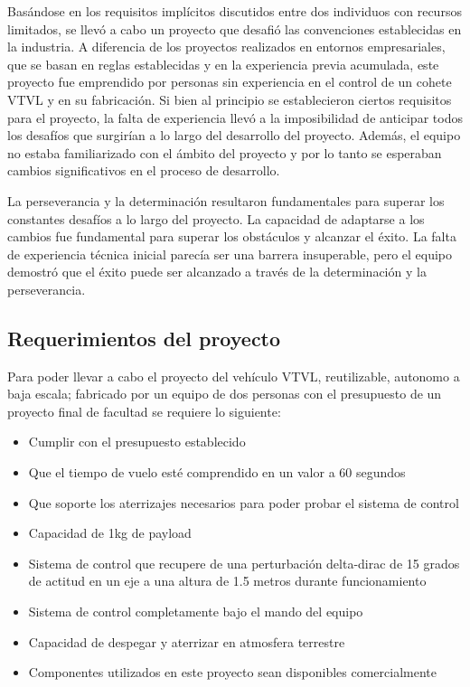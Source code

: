 Basándose en los requisitos implícitos discutidos entre dos individuos con recursos limitados, se llevó a cabo un proyecto que desafió las convenciones establecidas en la industria. A diferencia de los proyectos realizados en entornos empresariales, que se basan en reglas establecidas y en la experiencia previa acumulada, este proyecto fue emprendido por personas sin experiencia en el control de un cohete VTVL y en su fabricación. Si bien al principio se establecieron ciertos requisitos para el proyecto, la falta de experiencia llevó a la imposibilidad de anticipar todos los desafíos que surgirían a lo largo del desarrollo del proyecto. Además, el equipo no estaba familiarizado con el ámbito del proyecto y por lo tanto se esperaban cambios significativos en el proceso de desarrollo.

La perseverancia y la determinación resultaron fundamentales para superar los constantes desafíos a lo largo del proyecto. La capacidad de adaptarse a los cambios fue fundamental para superar los obstáculos y alcanzar el éxito. La falta de experiencia técnica inicial parecía ser una barrera insuperable, pero el equipo demostró que el éxito puede ser alcanzado a través de la determinación y la perseverancia.

\subsection*{Requerimientos del proyecto}
Para poder llevar a cabo el proyecto del vehículo VTVL, reutilizable, autonomo a baja escala; fabricado por un equipo de dos personas con el presupuesto de un proyecto final de facultad se requiere lo siguiente:
\begin{itemize}
    \item Cumplir con el presupuesto establecido
    \item Que el tiempo de vuelo esté comprendido en un valor a 60 segundos
    \item Que soporte los aterrizajes necesarios para poder probar el sistema de control
    \item Capacidad de 1kg de payload
    \item Sistema de control que recupere de una perturbación delta-dirac de 15 grados de actitud en un eje a una altura de 1.5 metros durante funcionamiento
    \item Sistema de control completamente bajo el mando del equipo
    \item Capacidad de despegar y aterrizar en atmosfera terrestre
    \item Componentes utilizados en este proyecto sean disponibles comercialmente
\end{itemize}

